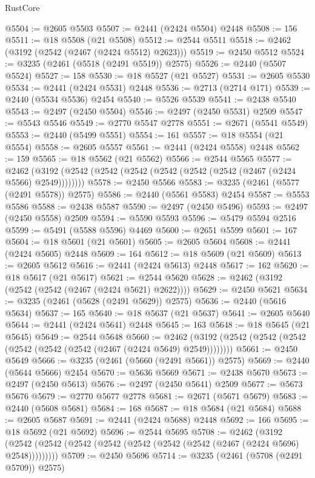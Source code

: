\begin{lexlean}{RustCore}
\begin{coremodule}
@5504 := @2605 @5503
@5507 := @2441 (@2424 @5504) @2448
@5508 := 156
@5511 := @18 @5508 (@21 @5508)
@5512 := @2544 @5511
@5518 := @2462 (@3192 (@2542 (@2467 (@2424 @5512) @2623)))
@5519 := @2450 @5512
@5524 := @3235 (@2461 (@5518 (@2491 @5519)) @2575)
@5526 := @2440 (@5507 @5524)
@5527 := 158
@5530 := @18 @5527 (@21 @5527)
@5531 := @2605 @5530
@5534 := @2441 (@2424 @5531) @2448
@5536 := @2713 (@2714 @171)
@5539 := @2440 (@5534 @5536) @2454
@5540 := @5526 @5539
@5541 := @2438 @5540
@5543 := @2497 (@2450 @5504)
@5546 := @2497 (@2450 @5531) @2509
@5547 := @5543 @5546
@5549 := @2770 @5547 @2778
@5551 := @2671 (@5541 @5549)
@5553 := @2440 (@5499 @5551)
@5554 := 161
@5557 := @18 @5554 (@21 @5554)
@5558 := @2605 @5557
@5561 := @2441 (@2424 @5558) @2448
@5562 := 159
@5565 := @18 @5562 (@21 @5562)
@5566 := @2544 @5565
@5577 := @2462 (@3192 (@2542 (@2542 (@2542 (@2542 (@2542 (@2542 (@2467 (@2424 @5566) @2549))))))))
@5578 := @2450 @5566
@5583 := @3235 (@2461 (@5577 (@2491 @5578)) @2575)
@5586 := @2440 (@5561 @5583) @2454
@5587 := @5553 @5586
@5588 := @2438 @5587
@5590 := @2497 (@2450 @5496)
@5593 := @2497 (@2450 @5558) @2509
@5594 := @5590 @5593
@5596 := @5479 @5594 @2516
@5599 := @5491 (@5588 @5596) @4469
@5600 := @2651 @5599
@5601 := 167
@5604 := @18 @5601 (@21 @5601)
@5605 := @2605 @5604
@5608 := @2441 (@2424 @5605) @2448
@5609 := 164
@5612 := @18 @5609 (@21 @5609)
@5613 := @2605 @5612
@5616 := @2441 (@2424 @5613) @2448
@5617 := 162
@5620 := @18 @5617 (@21 @5617)
@5621 := @2544 @5620
@5628 := @2462 (@3192 (@2542 (@2542 (@2467 (@2424 @5621) @2622))))
@5629 := @2450 @5621
@5634 := @3235 (@2461 (@5628 (@2491 @5629)) @2575)
@5636 := @2440 (@5616 @5634)
@5637 := 165
@5640 := @18 @5637 (@21 @5637)
@5641 := @2605 @5640
@5644 := @2441 (@2424 @5641) @2448
@5645 := 163
@5648 := @18 @5645 (@21 @5645)
@5649 := @2544 @5648
@5660 := @2462 (@3192 (@2542 (@2542 (@2542 (@2542 (@2542 (@2542 (@2467 (@2424 @5649) @2549))))))))
@5661 := @2450 @5649
@5666 := @3235 (@2461 (@5660 (@2491 @5661)) @2575)
@5669 := @2440 (@5644 @5666) @2454
@5670 := @5636 @5669
@5671 := @2438 @5670
@5673 := @2497 (@2450 @5613)
@5676 := @2497 (@2450 @5641) @2509
@5677 := @5673 @5676
@5679 := @2770 @5677 @2778
@5681 := @2671 (@5671 @5679)
@5683 := @2440 (@5608 @5681)
@5684 := 168
@5687 := @18 @5684 (@21 @5684)
@5688 := @2605 @5687
@5691 := @2441 (@2424 @5688) @2448
@5692 := 166
@5695 := @18 @5692 (@21 @5692)
@5696 := @2544 @5695
@5708 := @2462
    (@3192 (@2542 (@2542 (@2542 (@2542 (@2542 (@2542 (@2542 (@2467 (@2424 @5696) @2548)))))))))
@5709 := @2450 @5696
@5714 := @3235 (@2461 (@5708 (@2491 @5709)) @2575)

\end{coremodule}
\end{lexlean}
